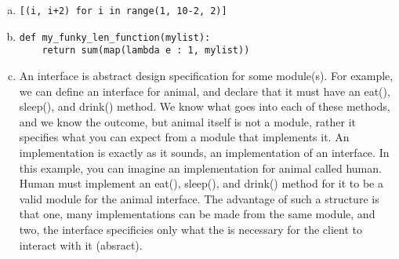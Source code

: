 \documentclass[12pt]{article}
\begin{document}
\begin{enumerate}[a)]
\item
\begin{lstlisting}
[(i, i+2) for i in range(1, 10-2, 2)]
\end{lstlisting}

\item
\begin{lstlisting}
def my_funky_len_function(mylist):
    return sum(map(lambda e : 1, mylist))
\end{lstlisting}

\item An interface is abstract design specification for some module(s). For example, we can define an interface for animal, and declare that it must have an eat(), sleep(), and drink() method. We know what goes into each of these methods, and we know the outcome, but animal itself is not a module, rather it specifies what you can expect from a module that implements it. An implementation is exactly as it sounds, an implementation of an interface. In this example, you can imagine an implementation for animal called human. Human must implement an eat(), sleep(), and drink() method for it to be a valid module for the animal interface. The advantage of such a structure is that one, many implementations can be made from the same module, and two, the interface specificies only what the is necessary for the client to interact with it (absract).


\end{enumerate}
\end{document}
